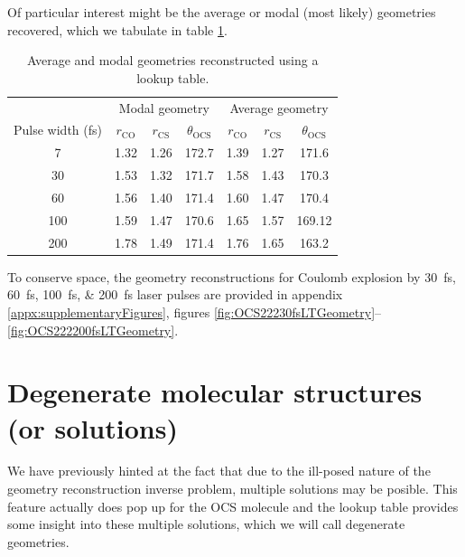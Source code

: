 Of particular interest might be the average or modal (most likely) geometries recovered, which we tabulate in table \ref{table:lookupTableGeometries}.

\begin{table}
  \myfloatalign
  \centering
  \begin{tabularx}{0.9\textwidth}{ccccccc}
    \toprule
    & \multicolumn{3}{c}{Modal geometry} & \multicolumn{3}{c}{Average geometry} \\
    Pulse width (fs) & $r_\mathrm{CO}$ & $r_\mathrm{CS}$ & $\theta_\mathrm{OCS}$ & $r_\mathrm{CO}$ & $r_\mathrm{CS}$ & $\theta_\mathrm{OCS}$ \\
    \midrule
    7 & 1.32 & 1.26 & 172.7 & 1.39 & 1.27 & 171.6 \\
    30 & 1.53 & 1.32 & 171.7 & 1.58 & 1.43 & 170.3 \\
    60 & 1.56 & 1.40 & 171.4 & 1.60 & 1.47 & 170.4 \\
    100 & 1.59 & 1.47 & 170.6 & 1.65 & 1.57 & 169.12 \\
    200 & 1.78 & 1.49 & 171.4 & 1.76 & 1.65 & 163.2 \\
    \bottomrule
  \end{tabularx}
  \caption[Average and modal geometries reconstructed using a lookup table.]
  {Average and modal geometries reconstructed using a lookup table.}
  \label{table:lookupTableGeometries}
\end{table}

To conserve space, the geometry reconstructions for Coulomb explosion by \SIlist{30;60;100;200}{\fs} laser pulses are provided in appendix \ref{appx:supplementaryFigures}, figures \ref{fig:OCS22230fsLTGeometry}--\ref{fig:OCS222200fsLTGeometry}.

\section{Degenerate molecular structures (or solutions)}
We have previously hinted at the fact that due to the ill-posed nature of the geometry reconstruction inverse problem, multiple solutions may be posible. This feature actually does pop up for the OCS molecule and the lookup table provides some insight into these multiple solutions, which we will call degenerate geometries.

